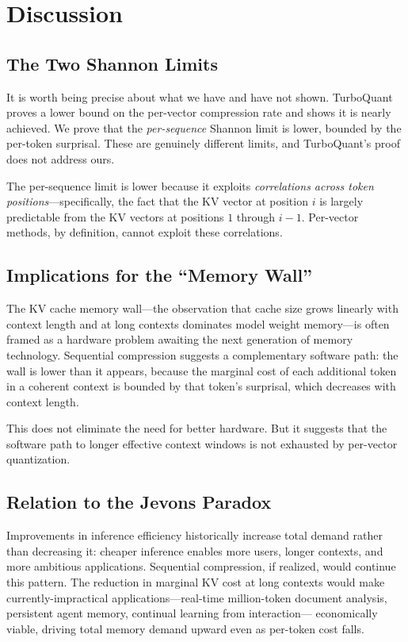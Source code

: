 \documentclass[11pt]{article}
\begin{document}
\section{Discussion}
\label{sec:discussion}

\subsection{The Two Shannon Limits}

It is worth being precise about what we have and have not shown.  TurboQuant
proves a lower bound on the per-vector compression rate and shows it is nearly
achieved.  We prove that the \emph{per-sequence} Shannon limit is lower, bounded
by the per-token surprisal.  These are genuinely different limits, and TurboQuant's
proof does not address ours.

The per-sequence limit is lower because it exploits \emph{correlations across
token positions}---specifically, the fact that the KV vector at position $i$ is
largely predictable from the KV vectors at positions $1$ through $i-1$.  Per-vector
methods, by definition, cannot exploit these correlations.

\subsection{Implications for the ``Memory Wall''}

The KV cache memory wall---the observation that cache size grows linearly with
context length and at long contexts dominates model weight memory---is often
framed as a hardware problem awaiting the next generation of memory technology.
Sequential compression suggests a complementary software path: the wall is lower
than it appears, because the marginal cost of each additional token in a coherent
context is bounded by that token's surprisal, which decreases with context length.

This does not eliminate the need for better hardware.  But it suggests that the
software path to longer effective context windows is not exhausted by per-vector
quantization.

\subsection{Relation to the Jevons Paradox}

Improvements in inference efficiency historically increase total demand rather
than decreasing it: cheaper inference enables more users, longer contexts, and
more ambitious applications.  Sequential compression, if realized, would
continue this pattern.  The reduction in marginal KV cost at long contexts
would make currently-impractical applications---real-time million-token document
analysis, persistent agent memory, continual learning from interaction---
economically viable, driving total memory demand upward even as per-token cost
falls.
\end{document}
